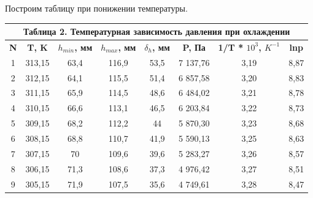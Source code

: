 \documentclass[a4paper,12pt]{article} %
\theoremstyle{plain} %
\theoremstyle{definition} %
\theoremstyle{remark} %
\begin{document}
\newpage
Построим таблицу при понижении температуры.
\begin{table}[H]
\begin{center}
\begin{tabular}{|c|c|c|c|c|c|c|c|}
\hline
\multicolumn{8}{|c|}{\textbf{Таблица 2. Температурная зависимость давления при охлаждении}}                                                                                   \\ \hline
\textbf{N} & \textbf{T, K} & \textbf{$h_{min}$, мм} & \textbf{$h_{max}$, мм} & \textbf{$\delta_{h}$, мм} & \textbf{P, Па} & \textbf{1/T * $10^{3}$, $K ^ {-1}$} & \textbf{lnp} \\ \hline
1          & 313,15        & 63,4                   & 116,9                  & 53,5                      & 7 137,76       & 3,19                                & 8,87         \\ \hline
2          & 312,15        & 64,1                   & 115,5                  & 51,4                      & 6 857,58       & 3,20                                & 8,83         \\ \hline
3          & 311,15        & 65,9                   & 114,5                  & 48,6                      & 6 484,02       & 3,21                                & 8,78         \\ \hline
4          & 310,15        & 66,6                   & 113,1                  & 46,5                      & 6 203,84       & 3,22                                & 8,73         \\ \hline
5          & 309,15        & 68,2                   & 112,2                  & 44                        & 5 870,30       & 3,23                                & 8,68         \\ \hline
6          & 308,15        & 68,8                   & 110,7                  & 41,9                      & 5 590,13       & 3,25                                & 8,63         \\ \hline
7          & 307,15        & 70                     & 109,6                  & 39,6                      & 5 283,27       & 3,26                                & 8,57         \\ \hline
8          & 306,15        & 71,3                   & 108,6                  & 37,3                      & 4 976,42       & 3,27                                & 8,51         \\ \hline
9          & 305,15        & 71,9                   & 107,5                  & 35,6                      & 4 749,61       & 3,28                                & 8,47         \\ \hline

\end{tabular}
\end{center}
\end{table}
\end{document}
